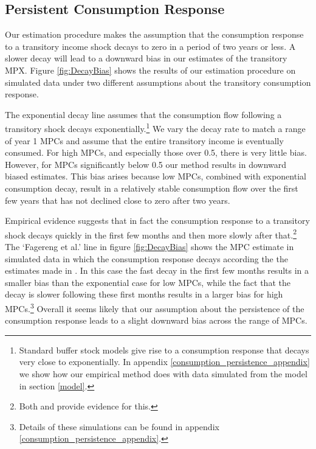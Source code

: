 \documentclass[titlepage]{\econtex}\newcommand{\texname}{ConsumptionHeterogeneity}
\begin{document}
\subsection{Persistent Consumption Response} \label{Consumption_persistence}
Our estimation procedure makes the assumption that the consumption response to a transitory income shock decays to zero in a period of two years or less. A slower decay will lead to a downward bias in our estimates of the transitory MPX. Figure \ref{fig:DecayBias} shows the results of our estimation procedure on simulated data under two different assumptions about the transitory consumption response.

The exponential decay line assumes that the consumption flow following a transitory shock decays exponentially.\footnote{Standard buffer stock models give rise to a consumption response that decays very close to exponentially. In appendix \ref{consumption_persistence_appendix} we show how our empirical method does with data simulated from the model in section \ref{model}.} We vary the decay rate to match a range of year 1 MPCs and assume that the entire transitory income is eventually consumed. For high MPCs, and especially those over 0.5, there is very little bias. However, for MPCs significantly below 0.5 our method results in downward biased estimates. This bias arises because low MPCs, combined with exponential consumption decay, result in a relatively stable consumption flow over the first few years that has not declined close to zero after two years.

Empirical evidence suggests that in fact the consumption response to a transitory shock decays quickly in the first few months and then more slowly after that.\footnote{Both \cite{fagereng_mpc_2016} and \cite{gelman_what_2016} provide evidence for this.} The `Fagereng et al.' line in figure \ref{fig:DecayBias} shows the MPC estimate in simulated data in which the consumption response decays according the the estimates made in \cite{fagereng_mpc_2016}. In this case the fast decay in the first few months results in a smaller bias than the exponential case for low MPCs, while the fact that the decay is slower following these first months results in a larger bias for high MPCs.\footnote{Details of these simulations can be found in appendix \ref{consumption_persistence_appendix}.} Overall it seems likely that our assumption about the persistence of the consumption response leads to a slight downward bias across the range of MPCs.
\end{document}
